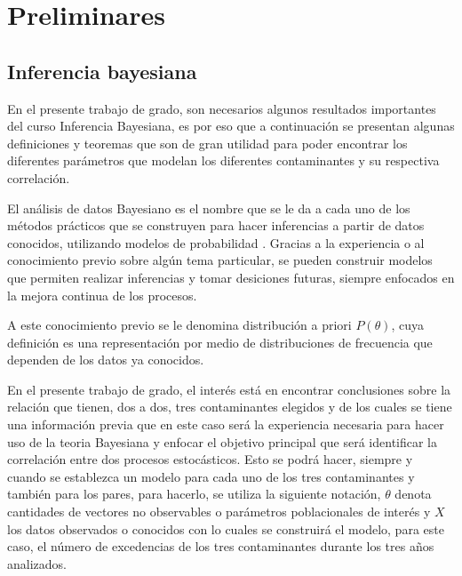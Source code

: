 \chapter{Preliminares}

\section{Inferencia bayesiana}
En el presente trabajo de grado, son necesarios algunos resultados importantes del curso Inferencia Bayesiana, es por eso que a continuación se presentan algunas definiciones y teoremas que son de gran utilidad para poder encontrar los diferentes parámetros que modelan los diferentes contaminantes y su respectiva correlación. 




El análisis de datos Bayesiano es el nombre que se le da a cada uno de los métodos prácticos que se construyen para hacer inferencias a partir de datos conocidos, utilizando modelos de probabilidad \cite{infe_bayes}. Gracias a la experiencia o al conocimiento previo sobre algún tema particular, se pueden construir modelos que permiten realizar inferencias y tomar desiciones futuras, siempre enfocados en la mejora continua de los procesos. 

A este conocimiento previo se le denomina distribución a priori $P(\theta)$, cuya definición es una representación por medio de distribuciones de frecuencia que dependen de los datos ya conocidos. 

En el presente trabajo de grado, el interés está en encontrar conclusiones sobre la relación que tienen, dos a dos, tres contaminantes elegidos y de los cuales se tiene una información previa que en este caso será la experiencia necesaria para hacer uso de la teoria Bayesiana y enfocar el objetivo principal que será identificar la correlación entre dos procesos estocásticos. Esto se podrá hacer, siempre y cuando se establezca un modelo para cada uno de los tres contaminantes y también para los pares, para hacerlo, se utiliza la siguiente notación, $\theta$ denota cantidades de vectores no observables o parámetros poblacionales de interés y  $X$ los datos observados o conocidos con lo cuales se construirá el modelo, para este caso, el número de excedencias de los tres contaminantes durante los tres años analizados. 


